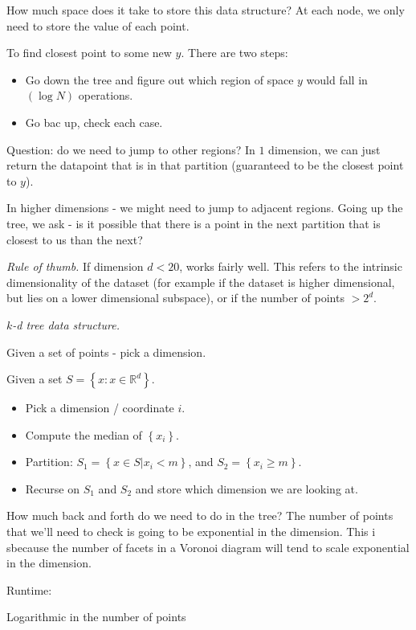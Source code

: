 \documentclass[12pt]{article}
\newcommand{\RR}{\mathbb{R}}
\begin{document}
How much space does it take to store this data structure?  At each node, we only need to store the value of each point.

To find closest point to some new $y$.  There are two steps:

\begin{itemize}
  \item Go down the tree and figure out which region of space $y$ would fall in $(\log N)$ operations.
  \item Go bac up, check each case.
\end{itemize}

Question: do we need to jump to other regions?  In $1$ dimension, we can just return the datapoint that is in that partition (guaranteed to be the closest point to $y$).

In higher dimensions - we might need to jump to adjacent regions.  Going up the tree, we ask - is it possible that there is a point in the next partition that is closest to us than the next?

{\it Rule of thumb.} If dimension $d < 20$, works fairly well.  This refers to the intrinsic dimensionality of the dataset (for example if the dataset is higher dimensional, but lies on a lower dimensional subspace), or if the number of points $> 2^d$.

{\it $k$-d tree data structure.} 

Given a set of points - pick a dimension. 

Given a set $S = \left\{ x: x \in \RR^d \right\}$.
\begin{itemize}
  \item Pick a dimension / coordinate $i$.
  \item Compute the median of $\left\{ x_i  \right\}$.

  \item Partition: $S_1 = \left\{ x \in S | x_i < m \right\}$, and $S_2 = \left\{ x_i \geq m \right\}.$
  \item Recurse on $S_1$ and $S_2$ and store which dimension we are looking at.
\end{itemize}

How much back and forth do we need to do in the tree?  The number of points that we'll need to check is going to be exponential in the dimension.  This i sbecause the number of facets in a Voronoi diagram will tend to scale exponential in the dimension.

Runtime:

Logarithmic in the number of points
\end{document}
